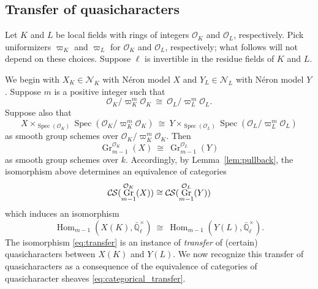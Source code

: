 \documentclass[10pt]{amsart}
\theoremstyle{plain}
\theoremstyle{definition}
\theoremstyle{remark}
\newcommand{\EE}{\mathbb{\bar Q}_\ell}
\newcommand{\OK}{\mathcal{O}_K}
\newcommand{\OL}{\mathcal{O}_L}
\newcommand{\Fq}{k}
\newcommand{\EEx}{\EE^\times}
\DeclareMathOperator{\Hom}{Hom}
\DeclareMathOperator{\Gr}{Gr}
\newcommand{\Spec}[1]{{\operatorname{Spec}(#1)}}
\newcommand{\iso}{{\ \cong\ }}
\newcommand{\CS}{{\mathcal{C\hskip-0.8pt S}}}
\begin{document}
\subsection{Transfer of quasicharacters}\label{ssec:transfer}

Let $K$ and $L$ be local fields with rings of integers $\OK$ and $\OL$, respectively. 
Pick uniformizers $\varpi_K$ and $\varpi_L$ for $\OK$ and $\OL$, respectively;
what follows will not depend on these choices.
Suppose $\ell$ is invertible in the residue fields of $K$ and $L$.

We begin with $X_K\in \mathcal{N}_K$ with N\'eron model $X$ and $Y_{L}\in \mathcal{N}_L$ with N\'eron model $Y$.
Suppose $m$ is a positive integer such that 
\[
\OK/\varpi_K^{m}\OK \iso \OL/\varpi_L^{m}\OL.
\]
Suppose also that
\begin{equation}\label{eq:schematic_transfer}
X \times_{\Spec{\OK}} \Spec{\OK/\varpi_K^{m}\OK} \iso Y \times_{\Spec{\OL}} \Spec{\OL/\varpi_L^{m}\OL}
\end{equation}
as smooth group schemes over $\OK/\varpi_K^{m}\OK$. 
Then
\[
\Gr^{\OK}_{m-1}(X) \iso \Gr^{\OL}_{m-1}(Y)
\]
as smooth group schemes over $\Fq$.  Accordingly, by Lemma~\ref{lem:pullback}, the isomorphism above determines an equivalence of categories
\begin{equation}\label{eq:categorical_transfer}
\CS(\Gr^{\OK}_{m-1}(X)) \cong \CS(\Gr^{\OL}_{m-1}(Y))
\end{equation}
which induces an isomorphism
\begin{equation}\label{eq:transfer}
\Hom_{m-1}(X(K),\EEx)  \iso  \Hom_{m-1}(Y(L),\EEx).
\end{equation}
The isomorphism \eqref{eq:transfer} is an instance of {\it transfer} of (certain) quasicharacters between $X(K)$ and $Y(L)$. 
We now recognize this transfer of quasicharacters as a consequence of the equivalence of categories of quasicharacter sheaves \eqref{eq:categorical_transfer}.
\end{document}
